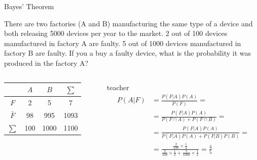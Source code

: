 \begin{frame}{Bayes' Theorem}
    \begin{example}
        \medskip
        {\small
        There are two factories (A and B) manufacturing the same type of a device and both releasing 5000 devices per year to the market. 2 out of 100 devices manufactured in factory A are faulty. 5 out of 1000 devices manufactured in factory B are faulty. If you a buy a faulty device, what is the probability it was produced in the factory A?}
    \end{example}
    \medskip
    \begin{columns}
        \begin{column}{0.35\textwidth}
            \begin{tabular}{c | c | c | c}
                & $A$   & $B$   & $\sum$ \\ \hline
                $F$       & 2     & 5     & 7 \\ \hline
                $\bar{F}$ & 98    & 995   & 1093 \\ \hline
                $\sum$    & 100   & 1000  & 1100 \\
            \end{tabular}  
        \end{column}
        
        \begin{column}{0.6\textwidth}
            \begin{shownto}{teacher}
            \pause
            {\small
            \begin{align*}
            P(A|F) &= \frac{P(F|A) P(A)}{P(F)} =\\
                   &= \frac{P(F|A) P(A)}{P(F \cap A) + P(F \cap B)} =\\
                   &= \frac{P(F|A) P(A)}{P(F|A) P(A) + P(F|B) P(B)} =\\
                   &= \frac{\frac{2}{100} \times \frac{1}{2}}{\frac{2}{100}\times\frac{1}{2} + \frac{5}{1000}\times\frac{1}{2}} = \frac{4}{5}\\
            \end{align*}
            }
            \end{shownto}
        \end{column}
    \end{columns}
\end{frame}

